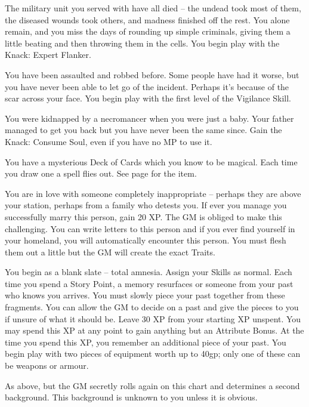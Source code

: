 \begin{list}{\addtocounter{list}{1}\textbf{:}}{\raggedleft}
\item{The military unit you served with have all died -- the undead took most of them, the diseased wounds took others, and madness finished off the rest.  You alone remain, and you miss the days of rounding up simple criminals, giving them a little beating and then throwing them in the cells.  You begin play with the Knack: Expert Flanker.}

\item{You have been assaulted and robbed before.  Some people have had it worse, but you have never been able to let go of the incident.  Perhaps it's because of the scar across your face.  You begin play with the first level of the Vigilance Skill.}

\item{You were kidnapped by a necromancer when you were just a baby.  Your father managed to get you back but you have never been the same since.  Gain the Knack: Consume Soul, even if you have no MP to use it.}

\item{You have a mysterious Deck of Cards which you know to be magical.  Each time you draw one a spell flies out.  See page \pageref{deckofmanythings} for the item.}

\item{You are in love with someone completely inappropriate -- perhaps they are above your station, perhaps from a family who detests you.  If ever you manage you successfully marry this person, gain 20 XP.  The GM is obliged to make this challenging.  You can write letters to this person and if you ever find yourself in your homeland, you will automatically encounter this person.  You must flesh them out a little but the GM will create the exact Traits.}

\item{You begin as a blank slate -- total amnesia.  Assign your Skills as normal. Each time you spend a Story Point, a memory resurfaces or someone from your past who knows you arrives.  You must slowly piece your past together from these fragments.  You can allow the GM to decide on a past and give the pieces to you if unsure of what it should be.  Leave 30 XP from your starting XP unspent.  You may spend this XP at any point to gain anything but an Attribute Bonus.  At the time you spend this XP, you remember an additional piece of your past.  You begin play with two pieces of equipment worth up to 40gp; only one of these can be weapons or armour.}

\item{As above, but the GM secretly rolls again on this chart and determines a second background.  This background is unknown to you unless it is obvious.}


\end{list}

